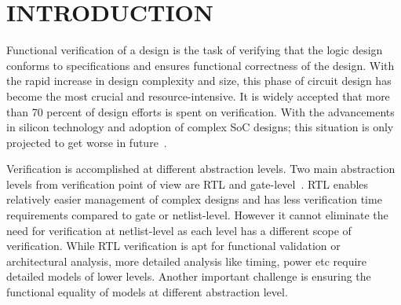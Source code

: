 \chapter{INTRODUCTION}

Functional verification of a design is the task of verifying that the logic design conforms to specifications and ensures functional correctness of the design.  With the rapid increase in design complexity and size, this phase of circuit design has become the most crucial and resource-intensive. It is widely accepted that more than 70 percent of design efforts is spent on verification. With the advancements in silicon technology and adoption of complex SoC designs; this situation is only projected to get worse in future~\citep{phd:zhang}. 

Verification is accomplished at different abstraction levels. Two main abstraction levels from verification point of view are RTL and gate-level~\citep{phd:zhang}. RTL enables relatively easier management of complex designs and has less verification time requirements compared to gate or netlist-level. However it cannot eliminate the need for verification at netlist-level as each level has a different scope of verification. While RTL verification is apt for functional validation or architectural analysis, more detailed analysis like timing, power etc require detailed models of lower levels. Another important challenge is ensuring the functional equality of models at different abstraction level.  

